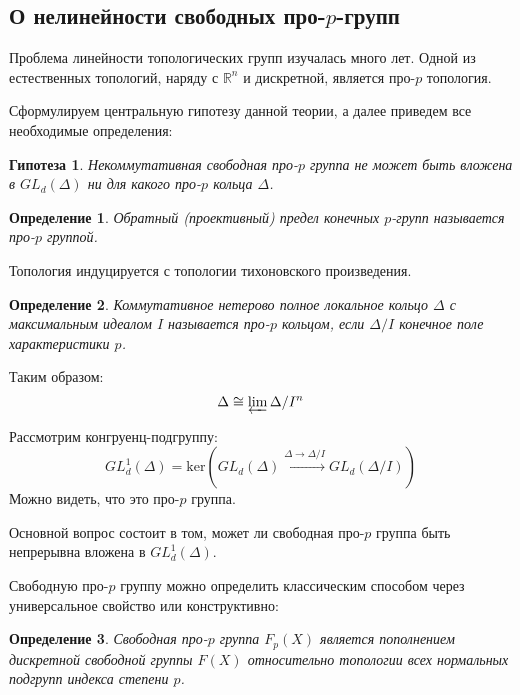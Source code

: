 \documentclass[12pt,a4paper]{article}
\newtheorem{definition}{Определение}[section]
\newtheorem{conjecture}{Гипотеза}[section]
\begin{document}
    \subsection{О нелинейности свободных про-$p$-групп}
    Проблема линейности топологических групп изучалась много лет.
    Одной из естественных топологий, наряду с $\mathbb{R}^n$ и дискретной, является про-$p$ топология.

    Сформулируем центральную гипотезу данной теории, а далее приведем все необходимые определения:

    \vskip 0.1in\noindent
    \begin{conjecture}
        Некоммутативная свободная про-$p$ группа не может быть вложена в $GL_d(\Delta)$ ни для какого про-$p$ кольца $\Delta$.
    \end{conjecture}
    \vskip 0.1in\noindent

    \vskip 0.1in\noindent
    \begin{definition}
        Обратный (проективный) предел конечных $p$-групп называется про-$p$ группой.
    \end{definition}
    \vskip 0.1in\noindent
    Топология индуцируется с топологии тихоновского произведения.

    \vskip 0.1in\noindent
    \begin{definition}
        Коммутативное нетерово полное локальное кольцо $\Delta$ с максимальным идеалом $I$ называется про-$p$ кольцом, если $\Delta/I$ конечное поле характеристики $p$.
    \end{definition}
    \vskip 0.1in\noindent

    Таким образом:
    \[
        \Delta \cong \varprojlim \Delta/I^n
    \]

    Рассмотрим конгруенц-подгруппу:
    \[
        GL_d^1(\Delta) = \mathrm{ker}\left( GL_d(\Delta) \xrightarrow{\Delta\to\Delta/I} GL_d(\Delta/I) \right)
    \]
    Можно видеть, что это про-$p$ группа.

    Основной вопрос состоит в том, может ли свободная про-$p$ группа быть непрерывна вложена в $GL_d^1(\Delta)$.

    Свободную про-$p$ группу можно определить классическим способом через универсальное свойство или конструктивно:

    \vskip 0.1in\noindent
    \begin{definition}
        Свободная про-$p$ группа $F_p(X)$ является пополнением дискретной свободной группы $F(X)$ относительно топологии всех нормальных подгрупп индекса степени $p$.
    \end{definition}
    \vskip 0.1in\noindent
\end{document}
